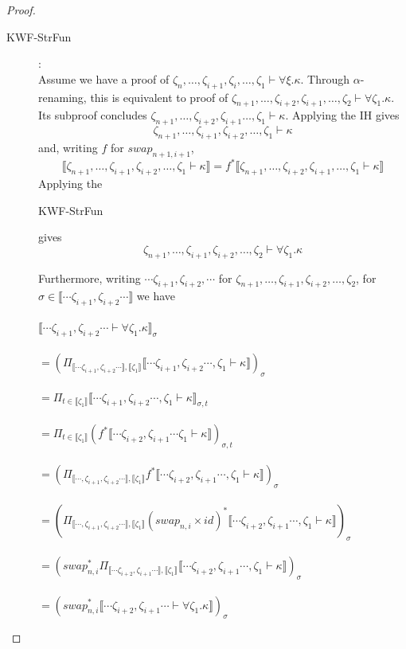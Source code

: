 \documentclass{article}
\newcommand{\sem}[1]{\llbracket #1 \rrbracket}
\begin{document}
\begin{proof}
\begin{description}
\item[KWF-StrFun]:~\\

Assume we have a proof of $\zeta_n,\ldots,\zeta_{i+1},\zeta_i,\ldots,\zeta_1 \vdash \forall \xi. \kappa$. Through $\alpha$-renaming, this is equivalent to proof of $\zeta_{n+1},\ldots,\zeta_{i+2},\zeta_{i+1},\ldots,\zeta_2 \vdash \forall \zeta_1. \kappa$. Its subproof concludes $\zeta_{n+1}, \ldots, \zeta_{i+2},\zeta_{i+1} \ldots, \zeta_1 \vdash \kappa$.  Applying the IH gives $$\zeta_{n+1},\ldots,\zeta_{i+1},\zeta_{i+2},\ldots,\zeta_1 \vdash \kappa$$ and, writing $f$ for $\mathit{swap}_{n+1,i+1}$, $$\sem{\zeta_{n+1},\ldots,\zeta_{i+1},\zeta_{i+2},\ldots,\zeta_1 \vdash \kappa} = f^* \sem{\zeta_{n+1},\ldots,\zeta_{i+2},\zeta_{i+1},\ldots,\zeta_1 \vdash \kappa}$$ Applying the \begin{sc}KWF-StrFun\end{sc} gives $$\zeta_{n+1},\ldots,\zeta_{i+1},\zeta_{i+2},\ldots,\zeta_2 \vdash \forall \zeta_1. \kappa $$

Furthermore, writing $\cdots \zeta_{i+1},\zeta_{i+2},\cdots$ for $\zeta_{n+1},\ldots,\zeta_{i+1},\zeta_{i+2},\ldots,\zeta_2$, for $\sigma \in \sem{\cdots \zeta_{i+1},\zeta_{i+2} \cdots}$ we have\\~\\
$\sem{\cdots \zeta_{i+1},\zeta_{i+2} \cdots \vdash \forall \zeta_1. \kappa}_\sigma$\\~\\
$= (\Pi_{\sem{\cdots \zeta_{i+1},\zeta_{i+2} \cdots}, \sem{\zeta_1}} \sem{\cdots \zeta_{i+1},\zeta_{i+2} \cdots,\zeta_1 \vdash \kappa})_\sigma$\\~\\
$= \Pi_{t \in \sem{\zeta_1}} \sem{\cdots \zeta_{i+1},\zeta_{i+2} \cdots,\zeta_1 \vdash \kappa}_{\sigma,t}$\\~\\
$= \Pi_{t \in \sem{\zeta_1}} (f^* \sem{\cdots \zeta_{i+2},\zeta_{i+1} \cdots \zeta_1 \vdash \kappa})_{\sigma,t}$\\~\\
$= (\Pi_{\sem{\cdots,\zeta_{i+1},\zeta_{i+2} \cdots},\sem{\zeta_1}} f^* \sem{\cdots \zeta_{i+2},\zeta_{i+1} \cdots,\zeta_1 \vdash \kappa} )_\sigma$\\~\\
$= (\Pi_{\sem{\cdots,\zeta_{i+1},\zeta_{i+2} \cdots},\sem{\zeta_1}} (\mathit{swap}_{n,i} \times \mathit{id})^* \sem{\cdots \zeta_{i+2},\zeta_{i+1} \cdots,\zeta_1 \vdash \kappa} )_\sigma$\\~\\
$= (\mathit{swap}_{n,i}^* \Pi_{\sem{\cdots \zeta_{i+2},\zeta_{i+1} \cdots},\sem{\zeta_1}} \sem{\cdots \zeta_{i+2},\zeta_{i+1} \cdots,\zeta_1 \vdash \kappa})_\sigma$\\~\\
$= (\mathit{swap}_{n,i}^* \sem{\cdots \zeta_{i+2},\zeta_{i+1} \cdots \vdash \forall \zeta_1 . \kappa})_\sigma$

\end{description}

\end{proof}
\end{document}
